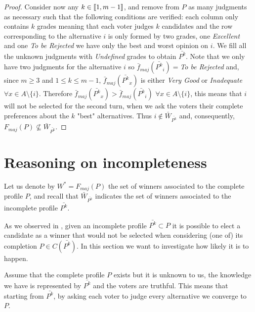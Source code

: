 \documentclass[version=3.21, pagesize, twoside=off, bibliography=totoc, DIV=calc, fontsize=12pt, a4paper]{scrartcl}
\begin{document}
\begin{proof}
	Consider now any $k \in \llbracket1,m-1\rrbracket$, and remove from $P$ as many judgments as necessary such that the following conditions are verified: each column only contains $k$ grades \textemdash meaning that each voter judges $k$ candidates \textemdash and the row corresponding to the alternative $i$ is only formed by two grades, one \textit{Excellent} and one \textit{To be Rejected} \textemdash we have only the best and worst opinion on $i$. We fill all the unknown judgments with \textit{Undefined} grades to obtain $\bar{P^k}$. Note that we only have two judgments for the alternative $i$ so $\bar{f}_{maj}(\bar{P^k}_i)=$\textit{To be Rejected} and, since $m\geq3$ and $1 \leq k \leq m-1$, $\bar{f}_{maj}(\bar{P^k}_x)$ is either \textit{Very Good} or \textit{Inadequate} $\forall x \in A \setminus \{i\}$. Therefore $\bar{f}_{maj}(\bar{P^k}_x) > \bar{f}_{maj}(\bar{P^k}_i)$ $\forall x \in A \setminus \{i\}$, this means that $i$ will not be selected for the second turn, when we ask the voters their complete preferences about the $k$ "best" alternatives. Thus $i \notin \bar{W}_{\bar{P^k}}$ and, consequently, $F_{maj}(P) \nsubseteq \bar{W}_{\bar{P^k}}$.
\end{proof}


\section{Reasoning on incompleteness}
Let us denote by $W^*=F_{maj}(P)$ the set of winners associated to the complete profile $P$, and recall that $\bar{W}_{\bar{P^k}}$ indicates the set of winners associated to the incomplete profile $\bar{P^k}$.

As we observed in , given an incomplete profile $\bar{P^k} \subset P$ it is possible to elect a candidate as a winner that would not be selected when considering (one of) its completion $P \in C(\bar{P^k})$. In this section we want to investigate how likely it is to happen.

Assume that the complete profile $P$ exists but it is unknown to us, the knowledge we have is represented by $\bar{P^k}$ and the voters are truthful. 
 
This means that starting from $\bar{P^k}$, by asking each voter to judge every alternative we converge to $P$.
\end{document}
